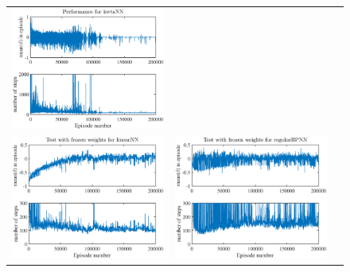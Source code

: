 \documentclass[preprint,12pt,authoryear]{elsarticle}
\begin{document}
\begin{figure}
\begin{center}
\begin{tabular}[h]{ccc}
\includegraphics[scale=0.2]{figures/acrobot-kwtaNN-performance.eps} \\
\includegraphics[scale=0.2]{figures/acrobot-linearNN-frozen-test.eps} &
\includegraphics[scale=0.2]{figures/acrobot-regularBPNN-frozen-test.eps} &

\end{tabular}
\end{center}
\end{figure}
\end{document}
